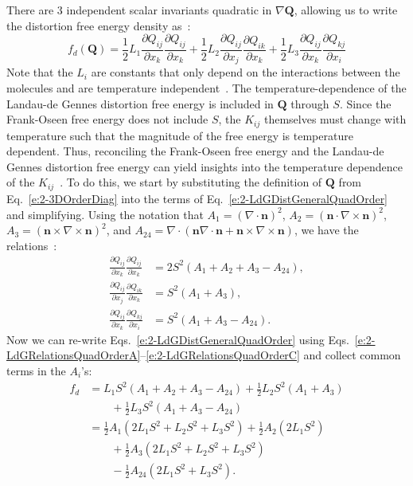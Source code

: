 There are 3 independent scalar invariants quadratic in $\nabla\mathbf{Q}$, allowing us to write the distortion free energy density as~\cite{RN189,RN198}:
\begin{equation}
  f_d(\mathbf{Q}) = \frac{1}{2} L_1 \frac{\partial Q_{ij}}{\partial x_k} \frac{\partial Q_{ij}}{\partial x_k}
    + \frac{1}{2} L_2 \frac{\partial Q_{ij}}{\partial x_j} \frac{\partial Q_{ik}}{\partial x_k}
    + \frac{1}{2} L_3 \frac{\partial Q_{ij}}{\partial x_k} \frac{\partial Q_{kj}}{\partial x_i}\label{e:2-LdGDistGeneralQuadOrder}
\end{equation}
Note that the $L_i$ are constants that only depend on the interactions between the molecules and are temperature independent~\cite{RN198}.
The temperature-dependence of the Landau-de Gennes distortion free energy is included in $\mathbf{Q}$ through $S$.
Since the Frank-Oseen free energy does not include $S$, the $K_{ij}$ themselves must change with temperature such that the magnitude  of the free energy is temperature dependent.
Thus, reconciling the Frank-Oseen free energy and the Landau-de Gennes distortion free energy can yield insights into the temperature dependence of the $K_{ij}$~\cite{RN189,RN198}.
To do this, we start by substituting the definition of $\mathbf{Q}$ from Eq.~\ref{e:2-3DOrderDiag} into the terms of Eq.~\ref{e:2-LdGDistGeneralQuadOrder} and simplifying. Using the notation that
    $A_1 = (\nabla \cdot \mathbf{n})^2$,
    $A_2 = (\mathbf{n} \cdot \nabla \times \mathbf{n})^2$,
    $A_3 = (\mathbf{n} \times \nabla \times \mathbf{n})^2$, and
    $A_{24} = \nabla \cdot (\mathbf{n} \nabla \cdot \mathbf{n} + \mathbf{n} \times \nabla \times \mathbf{n})$, we have the relations~\cite{RN189,RN198}:
\begin{align}
  \frac{\partial Q_{ij}}{\partial x_k} \frac{\partial Q_{ij}}{\partial x_k} & =
    2 S^2(A_1 + A_2 + A_3 -A_{24}),\label{e:2-LdGRelationsQuadOrderA} \\
  \frac{\partial Q_{ij}}{\partial x_j} \frac{\partial Q_{ik}}{\partial x_k} &=
    S^2 (A_1 + A_3),\label{e:2-LdGRelationsQuadOrderB}\\
  \frac{\partial Q_{ij}}{\partial x_k} \frac{\partial Q_{kj}}{\partial x_i} &=
    S^2 (A_1 + A_3 - A_{24}).\label{e:2-LdGRelationsQuadOrderC}
\end{align}
Now we can re-write Eqs.~\ref{e:2-LdGDistGeneralQuadOrder} using Eqs.~\ref{e:2-LdGRelationsQuadOrderA}--\ref{e:2-LdGRelationsQuadOrderC} and collect common terms in the $A_i$'s:
\begin{align}
  f_d &= L_1 S^2 (A_1 + A_2 + A_3 -A_{24}) + \frac{1}{2}L_2 S^2 (A_1 + A_3) \nonumber \\
  & \quad \quad + \frac{1}{2}L_3 S^2 (A_1 + A_3 - A_{24})\label{e:2-LdGRelationsSaddleSplayDegen} \\
      &= \frac{1}{2}A_1(2 L_1 S^2 + L_2 S^2 +L_3 S^2) + \frac{1}{2}A_2(2 L_1 S^2) \nonumber \\
      & \quad \quad + \frac{1}{2}A_3(2 L_1 S^2 + L_2 S^2 +L_3 S^2) \nonumber \\
      & \quad \quad - \frac{1}{2}A_{24}(2 L_1 S^2 + L_3 S^2).\label{e:2-LdGCompare}
\end{align}
